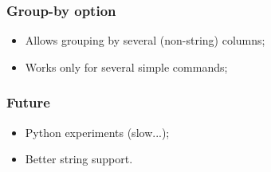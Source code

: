 \documentclass[14pt]{beamer}
\begin{document}
\begin{frame}
 \frametitle{Group-by option}
\begin{itemize}
 \item Allows grouping by several (non-string) columns;
 \item Works only for several simple commands;
\end{itemize}

\end{frame}

\begin{frame}
 \frametitle{Future}
\begin{itemize}
 \item Python experiments (slow...);
 \item Better string support.
\end{itemize}

\end{frame}
\end{document}
